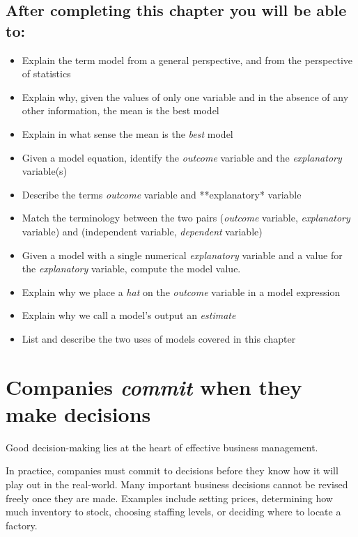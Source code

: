 \documentclass[
  12pt,
  letterpaper,
  DIV=11,
  numbers=noendperiod]{scrreprt}
\providecommand{\tightlist}{%
  \setlength{\itemsep}{0pt}\setlength{\parskip}{0pt}}
\begin{document}

\subsection*{After completing this chapter you will be able
to:}\label{after-completing-this-chapter-you-will-be-able-to-2}

\begin{itemize}
\tightlist
\item
  Explain the term model from a general perspective, and from the
  perspective of statistics
\item
  Explain why, given the values of only one variable and in the absence
  of any other information, the mean is the best model
\item
  Explain in what sense the mean is the \emph{best} model
\item
  Given a model equation, identify the \emph{outcome} variable and the
  \emph{explanatory} variable(s)
\item
  Describe the terms \emph{outcome} variable and **explanatory* variable
\item
  Match the terminology between the two pairs (\emph{outcome} variable,
  \emph{explanatory} variable) and (independent variable,
  \emph{dependent} variable)
\item
  Given a model with a single numerical \emph{explanatory} variable and
  a value for the \emph{explanatory} variable, compute the model value.
\item
  Explain why we place a \emph{hat} on the \emph{outcome} variable in a
  model expression
\item
  Explain why we call a model's output an \emph{estimate}
\item
  List and describe the two uses of models covered in this chapter
\end{itemize}

\section{\texorpdfstring{Companies \emph{commit} when they make
decisions}{Companies commit when they make decisions}}\label{companies-commit-when-they-make-decisions}

Good decision-making lies at the heart of effective business management.

In practice, companies must commit to decisions before they know how it
will play out in the real-world. Many important business decisions
cannot be revised freely once they are made. Examples include setting
prices, determining how much inventory to stock, choosing staffing
levels, or deciding where to locate a factory.
\end{document}

